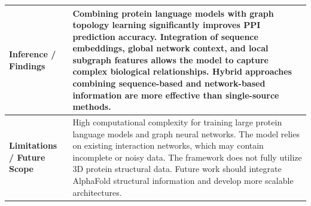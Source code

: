 \documentclass[12pt,a4paper]{report}
\begin{document}
\begin{table}[H]
\centering
\renewcommand{\arraystretch}{1.5}
\begin{tabular}{|p{}|p{}|}
\hline
\textbf{Inference / Findings} & Combining protein language models with graph topology learning significantly improves PPI prediction accuracy. Integration of sequence embeddings, global network context, and local subgraph features allows the model to capture complex biological relationships. Hybrid approaches combining sequence-based and network-based information are more effective than single-source methods. \\ \hline
\textbf{Limitations / Future Scope} & High computational complexity for training large protein language models and graph neural networks. The model relies on existing interaction networks, which may contain incomplete or noisy data. The framework does not fully utilize 3D protein structural data. Future work should integrate AlphaFold structural information and develop more scalable architectures. \\ \hline
\end{tabular}
\end{table}

\newpage
\end{document}
